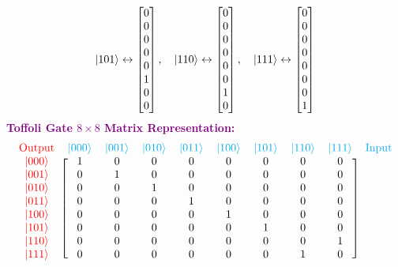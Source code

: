 \documentclass{book}
\begin{document}
\begin{align*}
\ket{101} \leftrightarrow \begin{bmatrix} 0 \\ 0 \\ 0 \\ 0 \\ 0 \\ 1 \\ 0 \\ 0 \end{bmatrix}, \quad \ket{110} \leftrightarrow \begin{bmatrix} 0 \\ 0 \\ 0 \\ 0 \\ 0 \\ 0 \\ 1 \\ 0 \end{bmatrix}, \quad \ket{111} \leftrightarrow \begin{bmatrix} 0 \\ 0 \\ 0 \\ 0 \\ 0 \\ 0 \\ 0 \\ 1 \end{bmatrix}
\end{align*}
\textcolor{purple}{\textbf{Toffoli Gate $8 \times 8$ Matrix Representation:}}
    \[
        \begin{blockarray}
        {cccccccccc}
        \textcolor{red}{\text{Output}} & \textcolor{cyan}{\ket{000}} & \textcolor{cyan}{\ket{001}} & \textcolor{cyan}{\ket{010}} & \textcolor{cyan}{\ket{011}} & \textcolor{cyan}{\ket{100}} & \textcolor{cyan}{\ket{101}} & \textcolor{cyan}{\ket{110}} & \textcolor{cyan}{\ket{111}} & \textcolor{cyan}{\text{Input}} \\
        \begin{block}{c[cccccccc]c}
        \textcolor{red}{\ket{000}} & 1 & 0 & 0 & 0 & 0 & 0 & 0 & 0 & \\
        \textcolor{red}{\ket{001}} & 0 & 1 & 0 & 0 & 0 & 0 & 0 & 0 & \\
        \textcolor{red}{\ket{010}} & 0 & 0 & 1 & 0 & 0 & 0 & 0 & 0 & \\
        \textcolor{red}{\ket{011}} & 0 & 0 & 0 & 1 & 0 & 0 & 0 & 0 & \\
        \textcolor{red}{\ket{100}} & 0 & 0 & 0 & 0 & 1 & 0 & 0 & 0 & \\
        \textcolor{red}{\ket{101}} & 0 & 0 & 0 & 0 & 0 & 1 & 0 & 0 & \\
        \textcolor{red}{\ket{110}} & 0 & 0 & 0 & 0 & 0 & 0 & 0 & 1 & \\
        \textcolor{red}{\ket{111}} & 0 & 0 & 0 & 0 & 0 & 0 & 1 & 0 & \\
        \end{block}
        \end{blockarray}
    \]
\newpage
\end{document}
